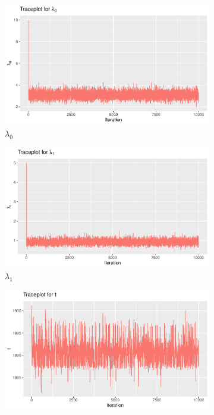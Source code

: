 \begin{figure}[h]
    \centering
    \begin{subfigure}[b]{0.49\textwidth}
        \centering
        \includegraphics[width = \textwidth]{Images/sim_lambda0.pdf}
        \caption{$\lambda_0$}
        \label{fig:burnin_lam0}
    \end{subfigure}
    \begin{subfigure}[b]{0.49\textwidth}
        \centering
        \includegraphics[width = \textwidth]{Images/sim_lambda1.pdf}
        \caption{$\lambda_1$}
        \label{fig:burnin_lam1}
    \end{subfigure}
    \begin{subfigure}[b]{0.49\textwidth}
        \centering
        \includegraphics[width = \textwidth]{Images/sim_t.pdf}

\end{subfigure}
\end{figure}
